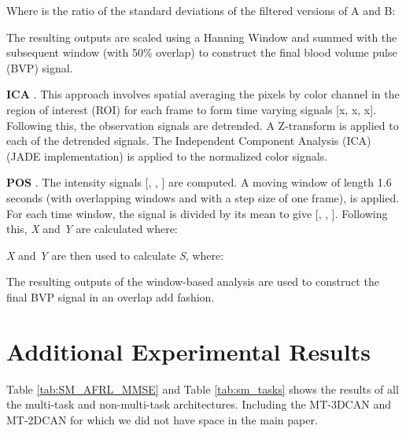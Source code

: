 \documentclass{article}
\begin{document}
Where  is the ratio of the standard deviations of the filtered versions of A and B:


The resulting outputs are scaled using a Hanning Window and summed with the subsequent window (with 50\% overlap) to construct the final blood volume pulse (BVP) signal.

\textbf{ICA} \citep{poh2010non}. This approach involves spatial averaging the pixels by color channel in the region of interest (ROI) for each frame to form time varying signals [x, x, x]. Following this, the
observation signals are detrended. A
Z-transform is applied to each of the detrended signals. The Independent Component Analysis (ICA) (JADE implementation) is applied to the normalized color signals. 

\textbf{POS} \citep{wang2016algorithmic}. The intensity signals [, , ] are computed. A moving window of length 1.6 seconds (with overlapping windows and with a step size of one frame), is applied. For each time window, the signal is divided by its mean to give [, , ]. Following this, \textit{X} and \textit{Y} are calculated where:


\textit{X} and \textit{Y} are then used to calculate \textit{S}, where:

The resulting outputs of the window-based analysis are used to construct the final BVP signal in an overlap add fashion.

\section{Additional Experimental Results}

Table \ref{tab:SM_AFRL_MMSE} and Table \ref{tab:sm_tasks} shows the results of all the multi-task and non-multi-task architectures. Including the MT-3DCAN and MT-2DCAN for which we did not have space in the main paper.
\end{document}
